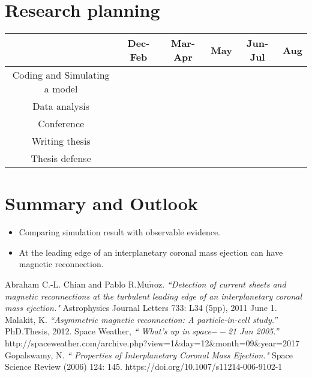 \documentclass[12pt, a4paper]{article}
\begin{document}
\section{Research planning}
\begin{table}[h]
\begin{tabular}{|c|c|c|c|c|c|}
\hline
 & Dec-Feb 	& Mar-Apr 	& May 	& Jun-Jul 	& Aug  \\ \hline
 Coding and Simulating a model	&{\cellcolor{teal}}&  			&  		&			&  \\ \hline
 Data analysis					&{\cellcolor{teal}}&{\cellcolor{teal}}&  		&		&  \\ \hline
 Conference						& 			&         	&{\cellcolor{teal}}&  			&  \\ \hline
 Writing thesis					&{\cellcolor{teal}}&{\cellcolor{teal}}&{\cellcolor{teal}}&{\cellcolor{teal}}&	\\ \hline
 Thesis defense					&			&			&		&			&{\cellcolor{teal}}\\ \hline
\end{tabular}
\end{table}
\section{Summary and Outlook}
\begin{itemize}
\item Comparing simulation result with observable evidence.
\item At the leading edge of an interplanetary coronal mass ejection can have magnetic reconnection.
\end{itemize}

\begin{thebibliography}{9}

 Abraham C.-L. Chian and Pablo R.Mu$\tilde{n}$oz. {\em “Detection of current sheets and magnetic reconnections at the turbulent leading edge of an interplanetary coronal mass ejection." }\/ Astrophysics Journal Letters 733: L34 (5pp), 2011 June 1.
 Malakit, K. {\em “Asymmetric magnetic reconnection: A particle-in-cell study.” }\/ PhD.Thesis, 2012.
 Space Weather, {\em “ What's up in space$--$21 Jan 2005.” }\/\\ http://spaceweather.com/archive.php?view=1\&day=12\&month=09\&year=2017
 Gopalswamy, N. {\em “ Properties of Interplanetary Coronal Mass Ejection."}\/ Space Science Review (2006) 124: 145. https://doi.org/10.1007/s11214-006-9102-1

\end{thebibliography}
\end{document}
